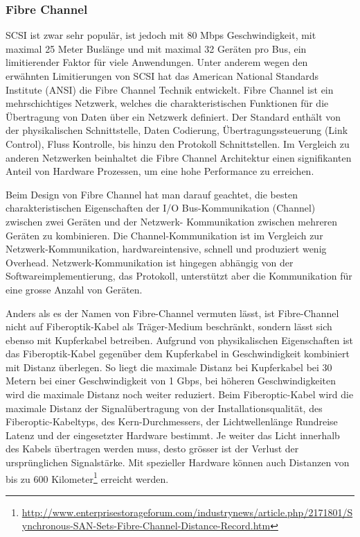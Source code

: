 \subsubsection{Fibre Channel}
SCSI ist zwar sehr populär, ist jedoch mit 80 Mbps Geschwindigkeit, mit maximal 25 Meter Buslänge und mit maximal 32 Geräten pro Bus, ein limitierender Faktor für viele Anwendungen. Unter anderem wegen den erwähnten Limitierungen von SCSI hat das American National Standards Institute (ANSI) die Fibre Channel Technik entwickelt. Fibre Channel ist ein mehrschichtiges Netzwerk, welches die charakteristischen Funktionen für die Übertragung von Daten über ein Netzwerk definiert. Der Standard enthält von der physikalischen Schnittstelle, Daten Codierung, Übertragungssteuerung (Link Control), Fluss Kontrolle, bis hinzu den Protokoll Schnittstellen. Im Vergleich zu anderen Netzwerken beinhaltet die Fibre Channel Architektur einen signifikanten Anteil von Hardware Prozessen, um eine hohe Performance zu erreichen. \cite{Gupta2002}\cite{Christopher2009}

Beim Design von Fibre Channel hat man darauf geachtet, die besten charakteristischen Eigenschaften der I/O Bus-Kommunikation (Channel) zwischen zwei Geräten und der Netzwerk- Kommunikation zwischen mehreren Geräten zu kombinieren. Die Channel-Kommunikation ist im Vergleich zur Netzwerk-Kommunikation, hardwareintensive, schnell und produziert wenig Overhead. Netzwerk-Kommunikation ist hingegen abhängig von der Softwareimplementierung, das Protokoll, unterstützt aber die Kommunikation für eine grosse Anzahl von Geräten.

Anders als es der Namen von Fibre-Channel vermuten lässt, ist Fibre-Channel nicht auf Fiberoptik-Kabel als Träger-Medium beschränkt, sondern lässt sich ebenso mit Kupferkabel betreiben. Aufgrund von physikalischen Eigenschaften ist das Fiberoptik-Kabel gegenüber dem Kupferkabel in Geschwindigkeit kombiniert mit Distanz überlegen. So liegt die maximale Distanz bei Kupferkabel bei 30 Metern bei einer Geschwindigkeit von 1 Gbps, bei höheren Geschwindigkeiten wird die maximale Distanz noch weiter reduziert. Beim Fiberoptic-Kabel wird die maximale Distanz der Signalübertragung von der Installationsqualität, des Fiberoptic-Kabeltyps, des Kern-Durchmessers, der Lichtwellenlänge Rundreise Latenz und der eingesetzter Hardware bestimmt. Je weiter das Licht innerhalb des Kabels übertragen werden muss, desto grösser ist der Verlust der ursprünglichen Signalstärke. Mit spezieller Hardware können auch Distanzen von bis zu 600 Kilometer\footnote{\url{http://www.enterprisestorageforum.com/industrynews/article.php/2171801/Synchronous-SAN-Sets-Fibre-Channel-Distance-Record.htm}} erreicht werden.

